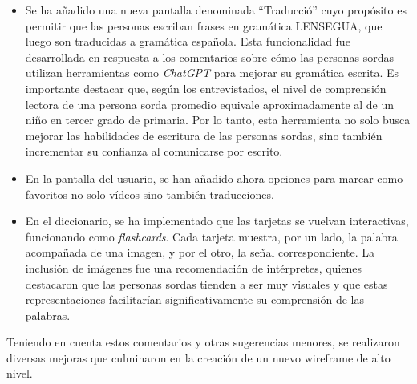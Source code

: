 \begin{itemize}
    \item 
    Se ha añadido una nueva pantalla denominada ``Traducció'' cuyo propósito es permitir que las personas escriban frases en gramática LENSEGUA, que luego son traducidas a gramática española. Esta funcionalidad fue desarrollada en respuesta a los comentarios sobre cómo las personas sordas utilizan herramientas como \textit{ChatGPT} para mejorar su gramática escrita. Es importante destacar que, según los entrevistados, el nivel de comprensión lectora de una persona sorda promedio equivale aproximadamente al de un niño en tercer grado de primaria. Por lo tanto, esta herramienta no solo busca mejorar las habilidades de escritura de las personas sordas, sino también incrementar su confianza al comunicarse por escrito.
    
    \item
    En la pantalla del usuario, se han añadido ahora opciones para marcar como favoritos no solo vídeos sino también traducciones.
    
    \item 
    En el diccionario, se ha implementado que las tarjetas se vuelvan interactivas, funcionando como \textit{flashcards}. Cada tarjeta muestra, por un lado, la palabra acompañada de una imagen, y por el otro, la señal correspondiente. La inclusión de imágenes fue una recomendación de intérpretes, quienes destacaron que las personas sordas tienden a ser muy visuales y que estas representaciones facilitarían significativamente su comprensión de las palabras.
    
\end{itemize}

Teniendo en cuenta estos comentarios y otras sugerencias menores, se realizaron diversas mejoras que culminaron en la creación de un nuevo wireframe de alto nivel.

